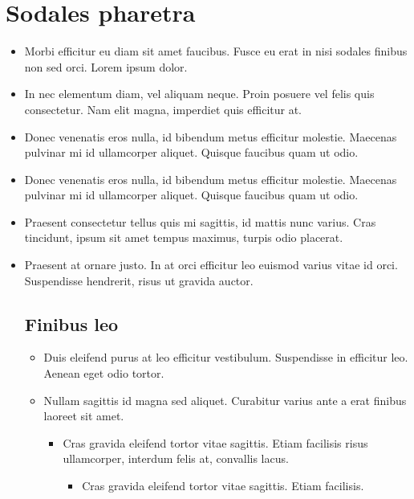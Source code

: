 \documentclass[header]{nosvagor-notes}
\begin{document}
\section{Sodales pharetra}
\begin{itemize}
  \item Morbi efficitur eu diam sit amet faucibus. Fusce eu erat in nisi
    sodales finibus non sed orci. Lorem ipsum dolor.

  \item In nec elementum diam, vel aliquam neque. Proin posuere vel felis quis
    consectetur. Nam elit magna, imperdiet quis efficitur at.

  \item Donec venenatis eros nulla, id bibendum metus efficitur molestie.
    Maecenas pulvinar mi id ullamcorper aliquet. Quisque faucibus quam ut odio.

  \item Donec venenatis eros nulla, id bibendum metus efficitur molestie.
    Maecenas pulvinar mi id ullamcorper aliquet. Quisque faucibus quam ut odio.

  \item Praesent consectetur tellus quis mi sagittis, id mattis nunc varius.
    Cras tincidunt, ipsum sit amet tempus maximus, turpis odio placerat.

  \item Praesent at ornare justo. In at orci efficitur leo euismod varius vitae
    id orci. Suspendisse hendrerit, risus ut gravida auctor.

  \subsection{Finibus leo}
  \begin{itemize}
    \item Duis eleifend purus at leo efficitur vestibulum. Suspendisse in
      efficitur leo. Aenean eget odio tortor.

    \item Nullam sagittis id magna sed aliquet. Curabitur varius ante a erat
      finibus laoreet sit amet.
      \begin{itemize}
        \item Cras gravida eleifend tortor vitae sagittis. Etiam facilisis
          risus ullamcorper, interdum felis at, convallis lacus.
          \begin{itemize}
            \item Cras gravida eleifend tortor vitae sagittis. Etiam facilisis.


\end{itemize}
\end{itemize}
\end{itemize}
\end{itemize}
\end{document}
